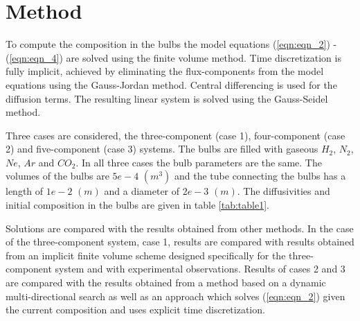 \documentclass[11]{Report}
\begin{document}
\section*{Method}
To compute the composition in the bulbs the model equations (\ref{eqn:eqn_2}) - (\ref{eqn:eqn_4}) are solved using the finite volume method. Time discretization is fully implicit, achieved by eliminating the flux-components from the model equations using the Gauss-Jordan method. Central differencing is used for the diffusion terms. The resulting linear system is solved using the Gauss-Seidel method.

Three cases are considered, the three-component (case 1), four-component (case 2) and five-component (case 3) systems. The bulbs are filled with gaseous $H_2$, $N_2$, $Ne$, $Ar$ and $CO_2$. In all three cases the bulb parameters are the same. The volumes of the bulbs are $5e-4$ $(m^3)$ and the tube connecting the bulbs has a length of $1e-2$ $(m)$ and a diameter of $2e-3$ $(m)$. The diffusivities and initial composition in the bulbs are given in table \ref{tab:table1}.

Solutions are compared with the results obtained from other methods. In the case of the three-component system, case 1, results are compared with results obtained from an implicit finite volume scheme designed specifically for the three-component system and with experimental observations. Results of cases 2 and 3 are compared with the results obtained from a method based on a dynamic multi-directional search as well as an approach which solves (\ref{eqn:eqn_2}) given the current composition and uses explicit time discretization. 
\end{document}
